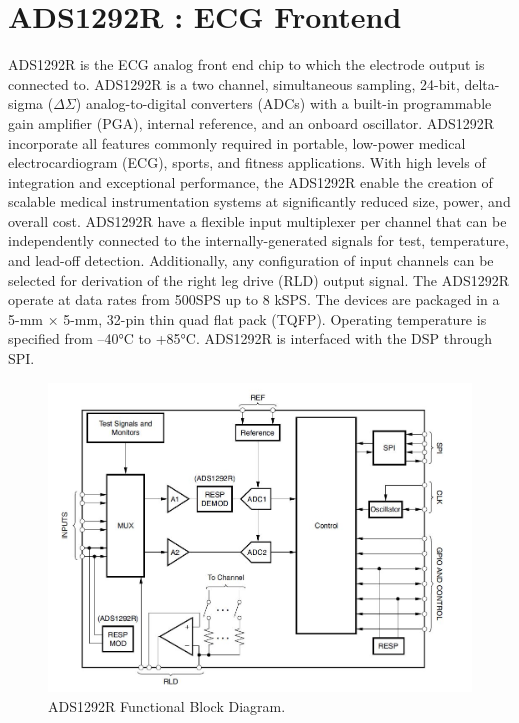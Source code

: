 \section{ADS1292R : ECG Frontend}
ADS1292R is the ECG analog front end chip to which the electrode output is connected to. ADS1292R is a two channel, simultaneous sampling, 24-bit, delta-sigma ($\Delta$$\Sigma$) analog-to-digital converters (ADCs) with a built-in programmable gain amplifier (PGA), internal reference, and an onboard oscillator. ADS1292R incorporate all features commonly required in portable, low-power medical electrocardiogram (ECG), sports, and fitness applications. With high levels of integration and exceptional performance, the ADS1292R enable the creation of scalable medical instrumentation systems at significantly reduced size, power, and overall cost. ADS1292R have a flexible input multiplexer per channel that can be independently connected to the internally-generated signals for test, temperature, and lead-off detection. Additionally, any configuration of input channels can be selected for derivation of the right leg drive (RLD) output signal. The ADS1292R operate at data rates from 500SPS up to 8 kSPS. The devices are packaged in a 5-mm × 5-mm, 32-pin thin quad flat pack (TQFP). Operating temperature is specified from –40°C to +85°C. ADS1292R is interfaced with the DSP through SPI.
 \begin{figure}[h]
 	\centering
 	\includegraphics[scale = 0.7 ]{ADS1292R.JPG}
 	\caption{ADS1292R Functional Block Diagram. \cite{ads}\label{ADS1292R}}
 \end{figure}
 
